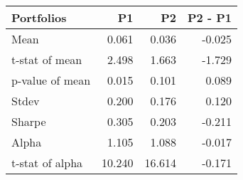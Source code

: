 \begin{tabular}{lrrr}
\toprule
Portfolios & P1 & P2 & P2 - P1 \\
\midrule
Mean & 0.061 & 0.036 & -0.025 \\
t-stat of mean & 2.498 & 1.663 & -1.729 \\
p-value of mean & 0.015 & 0.101 & 0.089 \\
Stdev & 0.200 & 0.176 & 0.120 \\
Sharpe & 0.305 & 0.203 & -0.211 \\
Alpha & 1.105 & 1.088 & -0.017 \\
t-stat of alpha & 10.240 & 16.614 & -0.171 \\
\bottomrule
\end{tabular}
